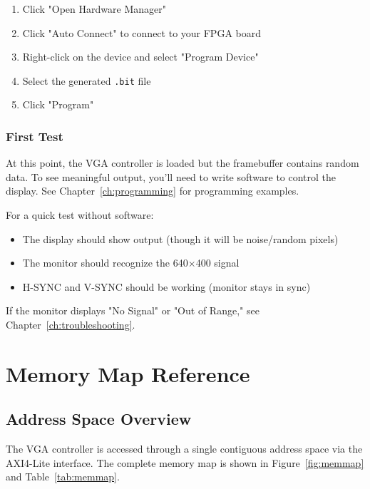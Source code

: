 \documentclass[11pt,letterpaper]{report}
\begin{document}
\begin{enumerate}
    \item Click "Open Hardware Manager"
    \item Click "Auto Connect" to connect to your FPGA board
    \item Right-click on the device and select "Program Device"
    \item Select the generated \texttt{.bit} file
    \item Click "Program"
\end{enumerate}

\subsection{First Test}

At this point, the VGA controller is loaded but the framebuffer contains random data. To see meaningful output, you'll need to write software to control the display. See Chapter~\ref{ch:programming} for programming examples.

For a quick test without software:
\begin{itemize}
    \item The display should show output (though it will be noise/random pixels)
    \item The monitor should recognize the 640$\times$400 signal
    \item H-SYNC and V-SYNC should be working (monitor stays in sync)
\end{itemize}

If the monitor displays "No Signal" or "Out of Range," see Chapter~\ref{ch:troubleshooting}.

\chapter{Memory Map Reference}

\section{Address Space Overview}

The VGA controller is accessed through a single contiguous address space via the AXI4-Lite interface. The complete memory map is shown in Figure~\ref{fig:memmap} and Table~\ref{tab:memmap}.
\end{document}
